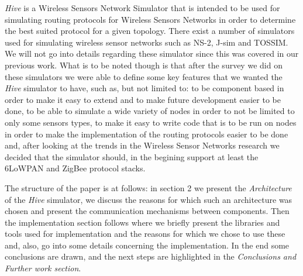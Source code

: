 \textit{Hive} is a Wireless Sensors Network Simulator that is intended to be
used for simulating routing protocols for Wireless Sensors Networks in order
to determine the best suited protocol for a given topology.
There exist a number of simulators used for simulating wireless sensor
networks such as NS-2, J-sim and TOSSIM. We will not go into details regarding
these simulator since this was covered in our previous work. What is to be
noted though is that after the survey we did on these simulators we were able
to define some key features that we wanted the \textit{Hive} simulator to
have, such as, but not limited to: to be component based in order to make it easy to extend and to make future development easier to
be done, to be able to simulate a wide variety of nodes in order to not be
limited to only some sensors types, to make it easy to write code that is to
be run on nodes in order to make the implementation of the routing protocols
easier to be done and, after looking at the trends in the Wireless Sensor
Networks research we decided that the simulator should, in the begining
support at least the 6LoWPAN and ZigBee protocol stacks.


The structure of the paper is at follows: in section 2 we present the
\textit{Architecture} of the \textit{Hive} simulator, we discuss the reasons for which such
an architecture was chosen and present the communication mechanisms between
components. Then the implementation section follows where we briefly present
the libraries and tools used for implementation and the reasons for which we
chose to use these and, also, go into some details concerning the implementation.
In the end some conclusions are drawn, and the next steps are highlighted in
the \textit{Conclusions and Further work section}. 
